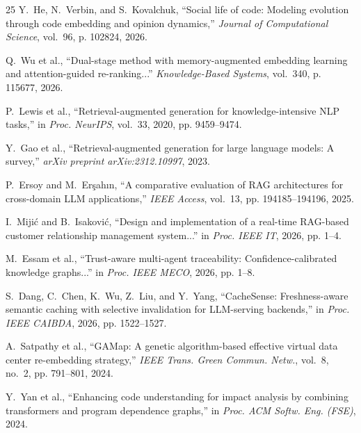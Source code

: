\documentclass[conference]{IEEEtran}
\begin{document}
\begin{thebibliography}{25}
Y.~He, N.~Verbin, and S.~Kovalchuk, ``Social life of code: Modeling evolution through code embedding and opinion dynamics,'' \emph{Journal of Computational Science}, vol.~96, p. 102824, 2026.

Q.~Wu et al., ``Dual-stage method with memory-augmented embedding learning and attention-guided re-ranking...'' \emph{Knowledge-Based Systems}, vol.~340, p. 115677, 2026.

P.~Lewis et al., ``Retrieval-augmented generation for knowledge-intensive NLP tasks,'' in \emph{Proc. NeurIPS}, vol.~33, 2020, pp. 9459--9474.

Y.~Gao et al., ``Retrieval-augmented generation for large language models: A survey,'' \emph{arXiv preprint arXiv:2312.10997}, 2023.

P.~Ersoy and M.~Er{\c{s}}ah{\i}n, ``A comparative evaluation of RAG architectures for cross-domain LLM applications,'' \emph{IEEE Access}, vol.~13, pp. 194185--194196, 2025.

I.~Miji{\'c} and B.~Isakovi{\'c}, ``Design and implementation of a real-time RAG-based customer relationship management system...'' in \emph{Proc. IEEE IT}, 2026, pp. 1--4.

M.~Essam et al., ``Trust-aware multi-agent traceability: Confidence-calibrated knowledge graphs...'' in \emph{Proc. IEEE MECO}, 2026, pp. 1--8.

S.~Dang, C.~Chen, K.~Wu, Z.~Liu, and Y.~Yang, ``CacheSense: Freshness-aware semantic caching with selective invalidation for LLM-serving backends,'' in \emph{Proc. IEEE CAIBDA}, 2026, pp. 1522--1527.

A.~Satpathy et al., ``GAMap: A genetic algorithm-based effective virtual data center re-embedding strategy,'' \emph{IEEE Trans. Green Commun. Netw.}, vol.~8, no.~2, pp. 791--801, 2024.

Y.~Yan et al., ``Enhancing code understanding for impact analysis by combining transformers and program dependence graphs,'' in \emph{Proc. ACM Softw. Eng. (FSE)}, 2024.

\end{thebibliography}
\end{document}
